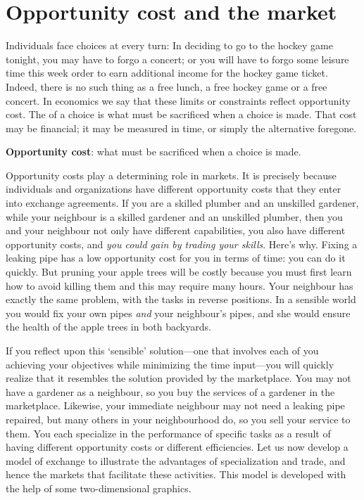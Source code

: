 \section{Opportunity cost and the market}\label{sec:ch1sec3}

Individuals face choices at every turn: In deciding to go to the hockey game tonight, you may have to forgo a concert; or you will have to forgo some leisure time this week order to earn additional income for the hockey game ticket. Indeed, there is no such thing as a free lunch, a free hockey game or a free concert. In economics we say that these limits or constraints reflect opportunity cost. The  of a choice is what must be sacrificed when a choice is made. That cost may be financial; it may be measured in time, or simply the alternative foregone.

\begin{DefBox}
\textbf{Opportunity cost}:  what must be sacrificed when a choice is made.
\end{DefBox}

Opportunity costs play a determining role in markets. It is precisely because individuals and organizations have different opportunity costs that they enter into exchange agreements. If you are a skilled plumber and an unskilled gardener, while your neighbour is a skilled gardener and an unskilled plumber, then you and your neighbour not only have different capabilities, you also have different opportunity costs, and \textit{you could gain by trading your skills}. Here's why. Fixing a leaking pipe has a low opportunity cost for you in terms of time: you can do it quickly. But pruning your apple trees will be costly because you must first learn how to avoid killing them and this may require many hours. Your neighbour has exactly the same problem, with the tasks in reverse positions. In a sensible world you would fix your own pipes \textit{and} your neighbour's pipes, and she would ensure the health of the apple trees in both backyards.

If you reflect upon this `sensible' solution---one that involves each of you achieving your objectives while minimizing the time input---you will quickly realize that it resembles the solution provided by the marketplace. You may not have a gardener as a neighbour, so you buy the services of a gardener in the marketplace. Likewise, your immediate neighbour may not need a leaking pipe repaired, but many others in your neighbourhood do, so you sell your service to them. You each specialize in the performance of specific tasks as a result of having different opportunity costs or different efficiencies. Let us now develop a model of exchange to illustrate the advantages of specialization and trade, and hence the markets that facilitate these activities. This model is developed with the help of some two-dimensional graphics.